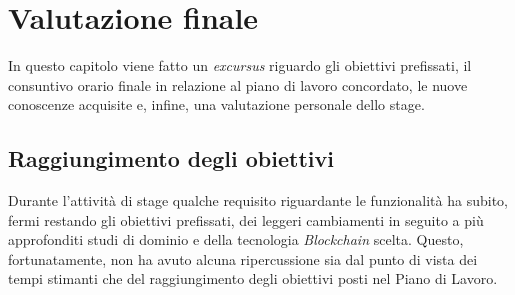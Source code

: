 
\chapter{Valutazione finale}
\label{cap:valutazione_finale}
In questo capitolo viene fatto un \textit{excursus} riguardo gli obiettivi prefissati, il consuntivo orario finale in relazione al piano di lavoro concordato, le nuove conoscenze acquisite e, infine, una valutazione personale dello stage.
\section{Raggiungimento degli obiettivi}
Durante l'attività di stage qualche requisito riguardante le funzionalità ha subito, fermi restando gli obiettivi prefissati, dei leggeri cambiamenti in seguito a più approfonditi studi di dominio e della tecnologia \textit{Blockchain} scelta. Questo, fortunatamente, non ha avuto alcuna ripercussione sia dal punto di vista dei tempi stimanti che del raggiungimento degli obiettivi posti nel Piano di Lavoro.
